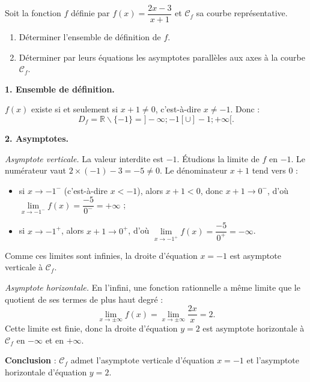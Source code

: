 \documentclass[11pt]{article}
\def\setminus{\mathbin{\backslash}}\let\smallsetminus\setminus
\begin{document}
\begin{exoresolu}
Soit la fonction $f$ définie par $f(x)=\dfrac{2x-3}{x+1}$ et $\mathcal{C}_f$ sa courbe représentative.
\begin{enumerate}
\item Déterminer l'ensemble de définition de $f$.
\item Déterminer par leurs équations les asymptotes parallèles aux axes à la courbe $\mathcal{C}_f$.
\end{enumerate}
\tcblower
\textbf{1. Ensemble de définition.}

$f(x)$ existe si et seulement si $x+1\neq 0$, c'est-à-dire $x\neq -1$. Donc :
\[D_f=\mathbb{R}\setminus\{-1\}=]-\infty;-1[\cup]-1;+\infty[.\]

\textbf{2. Asymptotes.}

\emph{Asymptote verticale.} La valeur interdite est $-1$. Étudions la limite de $f$ en $-1$. Le numérateur vaut $2\times(-1)-3=-5\neq 0$. Le dénominateur $x+1$ tend vers $0$ :
\begin{itemize}
\item si $x\to -1^-$ (c'est-à-dire $x<-1$), alors $x+1<0$, donc $x+1\to 0^-$, d'où $\lim\limits_{x\to -1^-}f(x)=\dfrac{-5}{0^-}=+\infty$ ;
\item si $x\to -1^+$, alors $x+1\to 0^+$, d'où $\lim\limits_{x\to -1^+}f(x)=\dfrac{-5}{0^+}=-\infty$.
\end{itemize}
Comme ces limites sont infinies, la droite d'équation $\boxed{x=-1}$ est asymptote verticale à $\mathcal{C}_f$.

\emph{Asymptote horizontale.} En l'infini, une fonction rationnelle a même limite que le quotient de ses termes de plus haut degré :
\[\lim_{x\to\pm\infty}f(x)=\lim_{x\to\pm\infty}\dfrac{2x}{x}=2.\]
Cette limite est finie, donc la droite d'équation $\boxed{y=2}$ est asymptote horizontale à $\mathcal{C}_f$ en $-\infty$ et en $+\infty$.

\textbf{Conclusion} : $\mathcal{C}_f$ admet l'asymptote verticale d'équation $x=-1$ et l'asymptote horizontale d'équation $y=2$.
\end{exoresolu}
\end{document}
